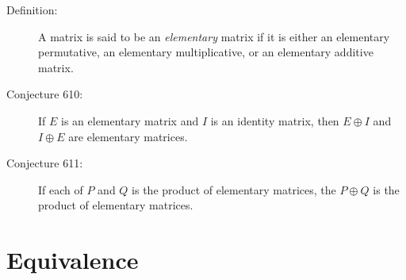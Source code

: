 \documentclass{article}
\begin{document}
\begin{description}
  \item[Definition:] A matrix is said to be an \emph{elementary} matrix if it is either an elementary permutative, an elementary multiplicative, or an elementary additive matrix.

  \item[Conjecture 610:] If $E$ is an elementary matrix and $I$ is an identity matrix, then $E \oplus I$ and $I \oplus E$ are elementary matrices.

  \item[Conjecture 611:] If each of $P$ and $Q$ is the product of elementary matrices, the $P \oplus Q$ is the product of elementary matrices.

\end{description}


\section{Equivalence}
\end{document}
